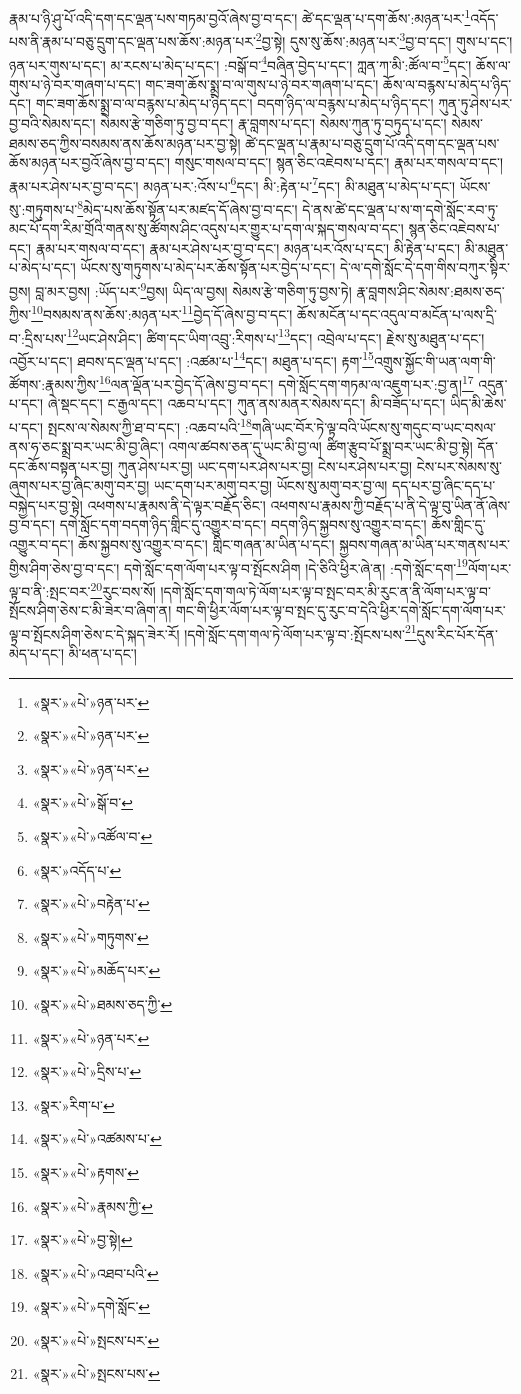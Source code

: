རྣམ་པ་ཉི་ཤུ་པོ་འདི་དག་དང་ལྡན་པས་གཏམ་བྱའོ་ཞེས་བྱ་བ་དང་། ཚེ་དང་ལྡན་པ་དག་ཆོས་:མཉན་པར་\footnote{«སྣར་»«པེ་»ཉན་པར་}འདོད་པས་ནི་རྣམ་པ་བཅུ་དྲུག་དང་ལྡན་པས་ཆོས་:མཉན་པར་\footnote{«སྣར་»«པེ་»ཉན་པར་}བྱ་སྟེ། དུས་སུ་ཆོས་:མཉན་པར་\footnote{«སྣར་»«པེ་»ཉན་པར་}བྱ་བ་དང་། གུས་པ་དང་། ཉན་པར་གུས་པ་དང་། མ་རངས་པ་མེད་པ་དང་། :བསྒོ་བ་\footnote{«སྣར་»«པེ་»སྒོ་བ་}བཞིན་བྱེད་པ་དང་། ཀླན་ཀ་མི་:ཚོལ་བ་\footnote{«སྣར་»«པེ་»འཚོལ་བ་}དང་། ཆོས་ལ་གུས་པ་ཉེ་བར་གཞག་པ་དང་། གང་ཟག་ཆོས་སྨྲ་བ་ལ་གུས་པ་ཉེ་བར་གཞག་པ་དང་། ཆོས་ལ་བརྙས་པ་མེད་པ་ཉིད་དང་། གང་ཟག་ཆོས་སྨྲ་བ་ལ་བརྙས་པ་མེད་པ་ཉིད་དང་། བདག་ཉིད་ལ་བརྙས་པ་མེད་པ་ཉིད་དང་། ཀུན་ཏུ་ཤེས་པར་བྱ་བའི་སེམས་དང་། སེམས་རྩེ་གཅིག་ཏུ་བྱ་བ་དང་། རྣ་བླགས་པ་དང་། སེམས་ཀུན་ཏུ་བཏུད་པ་དང་། སེམས་ཐམས་ཅད་ཀྱིས་བསམས་ནས་ཆོས་མཉན་པར་བྱ་སྟེ། ཚེ་དང་ལྡན་པ་རྣམ་པ་བཅུ་དྲུག་པོ་འདི་དག་དང་ལྡན་པས་ཆོས་མཉན་པར་བྱའོ་ཞེས་བྱ་བ་དང་། གསུང་གསལ་བ་དང་། སྙན་ཅིང་འཇེབས་པ་དང་། རྣམ་པར་གསལ་བ་དང་། རྣམ་པར་ཤེས་པར་བྱ་བ་དང་། མཉན་པར་:འོས་པ་\footnote{«སྣར་»འདོད་པ་}དང་། མི་:རྟེན་པ་\footnote{«སྣར་»«པེ་»བརྟེན་པ་}དང་། མི་མཐུན་པ་མེད་པ་དང་། ཡོངས་སུ་:གཏུགས་པ་\footnote{«སྣར་»«པེ་»གཏུགས་}མེད་པས་ཆོས་སྟོན་པར་མཛད་དོ་ཞེས་བྱ་བ་དང་། དེ་ནས་ཚེ་དང་ལྡན་པ་ས་ག་དགེ་སློང་རབ་ཏུ་མང་པོ་དག་རིམ་གྲོའི་གནས་སུ་ཚོགས་ཤིང་འདུས་པར་གྱུར་པ་དག་ལ་སྐད་གསལ་བ་དང་། སྙན་ཅིང་འཇེབས་པ་དང་། རྣམ་པར་གསལ་བ་དང་། རྣམ་པར་ཤེས་པར་བྱ་བ་དང་། མཉན་པར་འོས་པ་དང་། མི་རྟེན་པ་དང་། མི་མཐུན་པ་མེད་པ་དང་། ཡོངས་སུ་གཏུགས་པ་མེད་པར་ཆོས་སྟོན་པར་བྱེད་པ་དང་། དེ་ལ་དགེ་སློང་དེ་དག་གིས་བཀུར་སྟིར་བྱས། བླ་མར་བྱས། :ཡོད་པར་\footnote{«སྣར་»«པེ་»མཆོད་པར་}བྱས། ཡིད་ལ་བྱས། སེམས་རྩེ་གཅིག་ཏུ་བྱས་ཏེ། རྣ་བླགས་ཤིང་སེམས་:ཐམས་ཅད་ཀྱིས་\footnote{«སྣར་»«པེ་»ཐམས་ཅད་ཀྱི་}བསམས་ནས་ཆོས་:མཉན་པར་\footnote{«སྣར་»«པེ་»ཉན་པར་}བྱེད་དོ་ཞེས་བྱ་བ་དང་། ཆོས་མངོན་པ་དང་འདུལ་བ་མངོན་པ་ལས་དྲི་བ་:དྲིས་པས་\footnote{«སྣར་»«པེ་»དྲིས་པ་}ཡང་ཤེས་ཤིང་། ཚིག་དང་ཡིག་འབྲུ་:རིགས་པ་\footnote{«སྣར་»རིག་པ་}དང་། འབྲེལ་པ་དང་། རྗེས་སུ་མཐུན་པ་དང་། འབྱོར་པ་དང་། ཐབས་དང་ལྡན་པ་དང་། :འཚམ་པ་\footnote{«སྣར་»«པེ་»འཚམས་པ་}དང་། མཐུན་པ་དང་། རྟག་\footnote{«སྣར་»«པེ་»རྟགས་}འགྲུས་སྐྱོང་གི་ཡན་ལག་གི་ཚོགས་:རྣམས་ཀྱིས་\footnote{«སྣར་»«པེ་»རྣམས་ཀྱི་}ལན་ལྡོན་པར་བྱེད་དོ་ཞེས་བྱ་བ་དང་། དགེ་སློང་དག་གཏམ་ལ་འཇུག་པར་:བྱ་ན།\footnote{«སྣར་»«པེ་»བྱ་སྟེ།} འདུན་པ་དང་། ཞེ་སྡང་དང་། ང་རྒྱལ་དང་། འཆབ་པ་དང་། ཀུན་ནས་མནར་སེམས་དང་། མི་བཟོད་པ་དང་། ཡིད་མི་ཆེས་པ་དང་། སྤངས་ལ་སེམས་ཀྱི་ཐ་བ་དང་། :འཆབ་པའི་\footnote{«སྣར་»«པེ་»འཐབ་པའི་}གཞི་ཡང་བོར་ཏེ་ལྟ་བའི་ཡོངས་སུ་གདུང་བ་ཡང་བསལ་ནས་ཧ་ཅང་སྨྲ་བར་ཡང་མི་བྱ་ཞིང་། འགལ་ཚབས་ཅན་དུ་ཡང་མི་བྱ་ལ། ཚིག་རྩུབ་པོ་སྨྲ་བར་ཡང་མི་བྱ་སྟེ། དོན་དང་ཆོས་བསྟན་པར་བྱ། ཀུན་ཤེས་པར་བྱ། ཡང་དག་པར་ཤེས་པར་བྱ། ངེས་པར་ཤེས་པར་བྱ། ངེས་པར་སེམས་སུ་ཞུགས་པར་བྱ་ཞིང་མགུ་བར་བྱ། ཡང་དག་པར་མགུ་བར་བྱ། ཡོངས་སུ་མགུ་བར་བྱ་ལ། དད་པར་བྱ་ཞིང་དད་པ་བསྐྱེད་པར་བྱ་སྟེ། འཕགས་པ་རྣམས་ནི་དེ་ལྟར་བརྗོད་ཅིང་། འཕགས་པ་རྣམས་ཀྱི་བརྗོད་པ་ནི་དེ་ལྟ་བུ་ཡིན་ནོ་ཞེས་བྱ་བ་དང་། དགེ་སློང་དག་བདག་ཉིད་གླིང་དུ་འགྱུར་བ་དང་། བདག་ཉིད་སྐྱབས་སུ་འགྱུར་བ་དང་། ཆོས་གླིང་དུ་འགྱུར་བ་དང་། ཆོས་སྐྱབས་སུ་འགྱུར་བ་དང་། གླིང་གཞན་མ་ཡིན་པ་དང་། སྐྱབས་གཞན་མ་ཡིན་པར་གནས་པར་གྱིས་ཤིག་ཅེས་བྱ་བ་དང་། དགེ་སློང་དག་ལོག་པར་ལྟ་བ་སྤོངས་ཤིག །དེ་ཅིའི་ཕྱིར་ཞེ་ན། :དགེ་སློང་དག་\footnote{«སྣར་»«པེ་»དགེ་སློང་}ལོག་པར་ལྟ་བ་ནི་:སྤང་བར་\footnote{«སྣར་»«པེ་»སྤངས་པར་}རུང་བས་སོ། །དགེ་སློང་དག་གལ་ཏེ་ལོག་པར་ལྟ་བ་སྤང་བར་མི་རུང་ན་ནི་ལོག་པར་ལྟ་བ་སྤོངས་ཤིག་ཅེས་ང་མི་ཟེར་བ་ཞིག་ན། གང་གི་ཕྱིར་ལོག་པར་ལྟ་བ་སྤང་དུ་རུང་བ་དེའི་ཕྱིར་དགེ་སློང་དག་ལོག་པར་ལྟ་བ་སྤོངས་ཤིག་ཅེས་ང་དེ་སྐད་ཟེར་རོ། །དགེ་སློང་དག་གལ་ཏེ་ལོག་པར་ལྟ་བ་:སྤོངས་པས་\footnote{«སྣར་»«པེ་»སྤངས་པས་}དུས་རིང་པོར་དོན་མེད་པ་དང་། མི་ཕན་པ་དང་། 